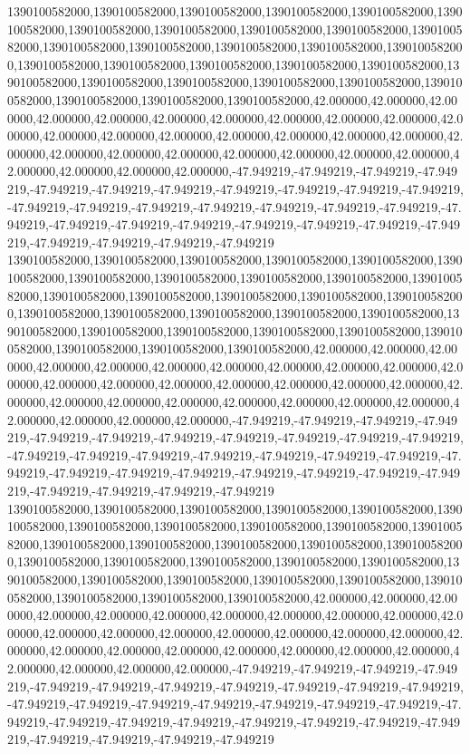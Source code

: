 1390100582000,1390100582000,1390100582000,1390100582000,1390100582000,1390100582000,1390100582000,1390100582000,1390100582000,1390100582000,1390100582000,1390100582000,1390100582000,1390100582000,1390100582000,1390100582000,1390100582000,1390100582000,1390100582000,1390100582000,1390100582000,1390100582000,1390100582000,1390100582000,1390100582000,1390100582000,1390100582000,1390100582000,1390100582000,1390100582000,42.000000,42.000000,42.000000,42.000000,42.000000,42.000000,42.000000,42.000000,42.000000,42.000000,42.000000,42.000000,42.000000,42.000000,42.000000,42.000000,42.000000,42.000000,42.000000,42.000000,42.000000,42.000000,42.000000,42.000000,42.000000,42.000000,42.000000,42.000000,42.000000,42.000000,-47.949219,-47.949219,-47.949219,-47.949219,-47.949219,-47.949219,-47.949219,-47.949219,-47.949219,-47.949219,-47.949219,-47.949219,-47.949219,-47.949219,-47.949219,-47.949219,-47.949219,-47.949219,-47.949219,-47.949219,-47.949219,-47.949219,-47.949219,-47.949219,-47.949219,-47.949219,-47.949219,-47.949219,-47.949219,-47.949219
1390100582000,1390100582000,1390100582000,1390100582000,1390100582000,1390100582000,1390100582000,1390100582000,1390100582000,1390100582000,1390100582000,1390100582000,1390100582000,1390100582000,1390100582000,1390100582000,1390100582000,1390100582000,1390100582000,1390100582000,1390100582000,1390100582000,1390100582000,1390100582000,1390100582000,1390100582000,1390100582000,1390100582000,1390100582000,1390100582000,42.000000,42.000000,42.000000,42.000000,42.000000,42.000000,42.000000,42.000000,42.000000,42.000000,42.000000,42.000000,42.000000,42.000000,42.000000,42.000000,42.000000,42.000000,42.000000,42.000000,42.000000,42.000000,42.000000,42.000000,42.000000,42.000000,42.000000,42.000000,42.000000,42.000000,-47.949219,-47.949219,-47.949219,-47.949219,-47.949219,-47.949219,-47.949219,-47.949219,-47.949219,-47.949219,-47.949219,-47.949219,-47.949219,-47.949219,-47.949219,-47.949219,-47.949219,-47.949219,-47.949219,-47.949219,-47.949219,-47.949219,-47.949219,-47.949219,-47.949219,-47.949219,-47.949219,-47.949219,-47.949219,-47.949219
1390100582000,1390100582000,1390100582000,1390100582000,1390100582000,1390100582000,1390100582000,1390100582000,1390100582000,1390100582000,1390100582000,1390100582000,1390100582000,1390100582000,1390100582000,1390100582000,1390100582000,1390100582000,1390100582000,1390100582000,1390100582000,1390100582000,1390100582000,1390100582000,1390100582000,1390100582000,1390100582000,1390100582000,1390100582000,1390100582000,42.000000,42.000000,42.000000,42.000000,42.000000,42.000000,42.000000,42.000000,42.000000,42.000000,42.000000,42.000000,42.000000,42.000000,42.000000,42.000000,42.000000,42.000000,42.000000,42.000000,42.000000,42.000000,42.000000,42.000000,42.000000,42.000000,42.000000,42.000000,42.000000,42.000000,-47.949219,-47.949219,-47.949219,-47.949219,-47.949219,-47.949219,-47.949219,-47.949219,-47.949219,-47.949219,-47.949219,-47.949219,-47.949219,-47.949219,-47.949219,-47.949219,-47.949219,-47.949219,-47.949219,-47.949219,-47.949219,-47.949219,-47.949219,-47.949219,-47.949219,-47.949219,-47.949219,-47.949219,-47.949219,-47.949219
